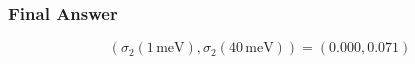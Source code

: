 \subsubsection*{Final Answer}

\[
\boxed{\left(\sigma_2(1\,\mathrm{meV}),\sigma_2(40\,\mathrm{meV})\right)=(0.000,0.071)}
\]
